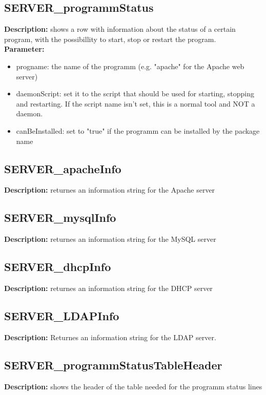 \subsection{SERVER\_programmStatus}
\textbf{Description:} shows a row with information about the status of a certain program, with the possibillity to start, stop or restart the program.\\
\textbf{Parameter:}
\begin{itemize}
\item progname: the name of the programm (e.g. "apache" for the Apache web server)
\item daemonScript: set it to the script that should be used for starting, stopping and restarting. If the script name isn't set, this is a normal tool and NOT a daemon.
\item canBeInstalled: set to "true" if the programm can be installed by the package name
\end{itemize}

\subsection{SERVER\_apacheInfo}
\textbf{Description:} returnes an information string for the Apache server\\

\subsection{SERVER\_mysqlInfo}
\textbf{Description:} returnes an information string for the MySQL server\\

\subsection{SERVER\_dhcpInfo}
\textbf{Description:} returnes an information string for the DHCP server\\

\subsection{SERVER\_LDAPInfo}
\textbf{Description:} Returnes an information string for the LDAP server.\\

\subsection{SERVER\_programmStatusTableHeader}
\textbf{Description:} shows the header of the table needed for the programm status lines\\

